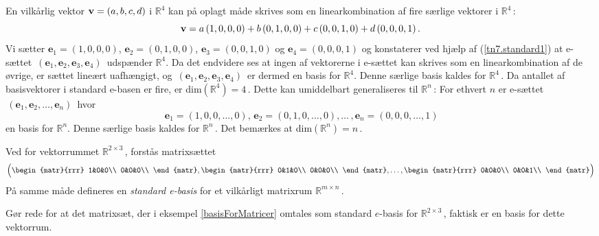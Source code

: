 \begin{example}
En vilkårlig vektor $\mathbf{v}=(a,b,c,d)$ i $\mathbb R^4$ kan på oplagt måde skrives som en linearkombination af fire særlige vektorer i $\mathbb R^4\,:$ 
\begin{equation}\label{tn7.standard1}
\mathbf{v}=a\,(1,0,0,0)+b\,(0,1,0,0)+c\,(0,0,1,0)+d\,(0,0,0,1)\,.
\end{equation}
Vi sætter 
$\mathbf e_1=(1,0,0,0)$, $\mathbf e_2=(0,1,0,0)$, $\mathbf e_3=(0,0,1,0)$ og $\mathbf e_4=(0,0,0,1)$
og konstaterer ved hjælp af (\ref{tn7.standard1}) at e-sættet $\,(\mathbf e_1,\mathbf e_2,\mathbf e_3,\mathbf e_4)\,$ udspænder $\mathbb R^4$.\bs
 Da det endvidere ses at ingen af vektorerne i e-sættet kan skrives som en linearkombination af de øvrige, er sættet lineært uafhængigt, og $\,(\mathbf e_1,\mathbf e_2,\mathbf e_3,\mathbf e_4)\,$ er dermed en basis for $\mathbb R^4$. Denne særlige basis kaldes  for $\mathbb R^4\,$. Da antallet af basisvektorer i standard e-basen er fire, er dim$(\mathbb R^4)=4\,.$\bs
Dette kan umiddelbart generaliseres til $\mathbb R^n\,$: For ethvert $n$ er e-sættet $\,(\mathbf e_1,\mathbf e_2,\ldots,\mathbf e_n)\,$ hvor 
$$\,\mathbf e_1=(1,0,0,\ldots,0),\,\mathbf e_2=(0,1,0,\ldots,0),\ldots\,,\mathbf e_n=(0,0,0,\ldots,1)$$ en basis for $\mathbb R^n$. Denne særlige basis kaldes  for $\mathbb R^n\,$. Det bemærkes at dim$(\mathbb R^n)=n\,$.
\end{example}

\begin{example}\label{basisForMatricer}
Ved  for vektorrummet $\mathbb R^{2 \times 3}\,$, forstås matrixsættet
\begin{equation}\label{matrixBasis}
\Big(\begin{matr}{rrr}
 1&0&0\\
 0&0&0\\
 \end{matr},
 \begin{matr}{rrr}
 0&1&0\\
 0&0&0\\
 \end{matr},
 \ldots,
 \begin{matr}{rrr}
 0&0&0\\
 0&0&1\\
 \end{matr}\Big)
 \end{equation}
 På samme måde defineres en \textit{standard e-basis} for et vilkårligt matrixrum $\mathbb R^{m \times n}\,$. 
 \end{example}
 \begin{exercise}
 Gør rede for at det matrixsæt, der i eksempel \ref{basisForMatricer} omtales som standard $e$-basis for $\mathbb R^{2 \times 3}\,$, faktisk er en basis for dette vektorrum.
 \end{exercise}

